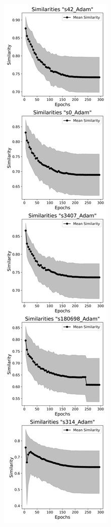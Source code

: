 \begin{figure}[h!]
      \centering
      \begin{subfigure}[b]{0.3\textwidth}
        \includegraphics[width=\textwidth]{figures/cifar_similarities_Adam_V2.png}

\end{subfigure}
\end{figure}
